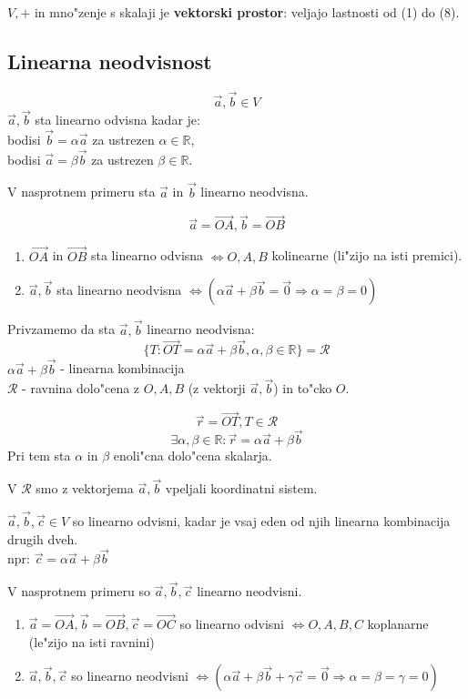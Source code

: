 \(V, +\) in mno"zenje s skalaji je \textbf{vektorski prostor}: veljajo lastnosti od (1) do (8).

\subsection{Linearna neodvisnost}
\[\vec{a}, \vec{b} \in V\]
\(\vec{a}, \vec{b}\) sta linearno odvisna kadar je:\\
\hspace*{10pt} bodisi \(\vec{b} = \alpha \vec{a}\) za ustrezen \(\alpha \in \mathbb{R}\),\\
\hspace*{10pt} bodisi \(\vec{a}  = \beta \vec{b}\) za ustrezen \(\beta \in \mathbb{R}\).

V nasprotnem primeru sta \(\vec{a}\) in \(\vec{b}\) linearno neodvisna.

\[\vec{a} = \vec{OA}, \vec{b} = \vec{OB}\]

\begin{enumerate}
	\item \(\vec{OA}\) in \(\vec{OB}\) sta linearno odvisna \(\Leftrightarrow O, A, B\) kolinearne (li"zijo na isti premici).
	\item \(\vec{a}, \vec{b}\) sta linearno neodvisna \(\Leftrightarrow (\alpha \vec{a} + \beta \vec{b} = \vec{0} \Rightarrow \alpha = \beta = 0)\)
\end{enumerate}

Privzamemo da sta \(\vec{a}, \vec{b}\) linearno neodvisna:
\[\{T: \vec{OT} = \alpha \vec{a} + \beta \vec{b}, \alpha, \beta \in \mathbb{R}\} = \mathcal{R}\]
\( \alpha \vec{a} + \beta \vec{b}\) - linearna kombinacija\\
\(\mathcal{R}\) - ravnina dolo"cena z \(O, A, B\) (z vektorji \(\vec{a}, \vec{b}\)) in to"cko \(O\).

\[\vec{r} = \vec{OT}, T \in \mathcal{R}\]
\[\exists \alpha, \beta \in \mathbb{R}: \vec{r} = \alpha \vec{a} + \beta \vec{b} \]
Pri tem sta \(\alpha\) in \(\beta\) enoli"cna dolo"cena skalarja.

V \(\mathcal{R}\) smo z vektorjema \(\vec{a}, \vec{b}\) vpeljali koordinatni sistem.

\(\vec{a}, \vec{b}, \vec{c} \in V\) so linearno odvisni, kadar je vsaj eden od njih linearna kombinacija drugih dveh.\\
npr: \(\vec{c} = \alpha \vec{a} + \beta \vec{b}\)

V nasprotnem primeru so \(\vec{a}, \vec{b}, \vec{c}\) linearno neodvisni.

\begin{enumerate}
	\item \(\vec{a} = \vec{OA}, \vec{b} = \vec{OB}, \vec{c} = \vec{OC}\) so linearno odvisni \(\Leftrightarrow O, A, B, C\) koplanarne (le"zijo na isti ravnini)
	\item \(\vec{a}, \vec{b}, \vec{c}\) so linearno neodvisni \(\Leftrightarrow (\alpha \vec{a} + \beta \vec{b} + \gamma \vec{c} = \vec{0} \Rightarrow \alpha = \beta = \gamma = 0)\)
\end{enumerate}

